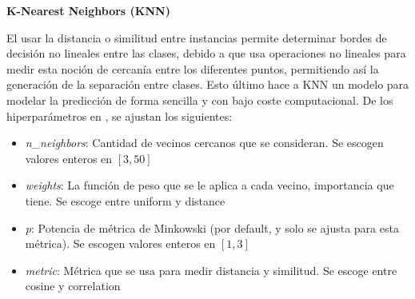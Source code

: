 \documentclass[12pt,a4paper]{article}
\begin{document}
{{            \textbf{K-Nearest Neighbors (KNN)}\\
            {
                El usar la distancia o similitud entre instancias permite determinar bordes de decisión	 
                no lineales entre las clases, debido a que usa operaciones no lineales para medir esta 
                noción de cercanía entre los diferentes puntos, permitiendo así la generación de la 
                separación entre clases. Esto último hace a KNN un modelo para modelar la predicción 
                de forma sencilla y con bajo coste computacional. De los hiperparámetros en \cite{sklearn_knn}, 
                se ajustan los siguientes:
                \begin{itemize}
                    \item \emph{n\_neighbors}: Cantidad de vecinos cercanos que se consideran. Se escogen valores enteros en $[3,50]$
                    \item \emph{weights}: La función de peso que se le aplica a cada vecino, importancia que tiene. Se escoge entre uniform y distance
                    \item \emph{p}: Potencia de métrica de Minkowski (por default, y solo se ajusta para esta métrica). Se escogen valores enteros en $[1,3]$
                    \item \emph{metric}: Métrica que se usa para medir distancia y similitud. Se escoge entre cosine y correlation
                \end{itemize}
            }
        }
    }
    \newpage
\end{document}
